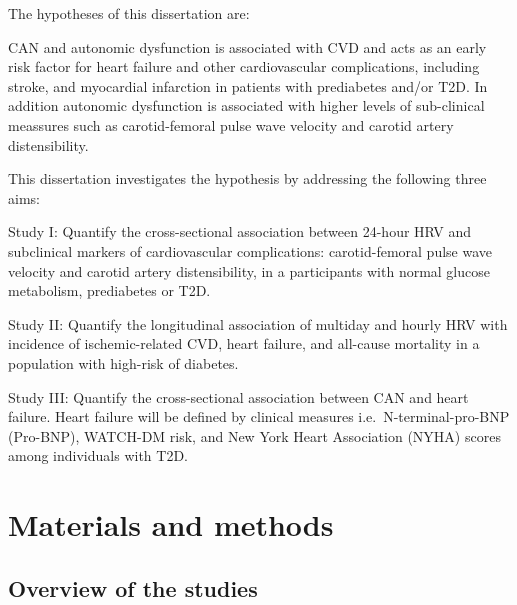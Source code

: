 \documentclass[
  a4paper,
  headsepline=true,
  open=any]{scrbook}
\begin{document}
The hypotheses of this dissertation are:

CAN and autonomic dysfunction is associated with CVD and acts as an
early risk factor for heart failure and other cardiovascular
complications, including stroke, and myocardial infarction in patients
with prediabetes and/or T2D. In addition autonomic dysfunction is
associated with higher levels of sub-clinical meassures such as
carotid-femoral pulse wave velocity and carotid artery distensibility.

This dissertation investigates the hypothesis by addressing the
following three aims:

Study I: Quantify the cross-sectional association between 24-hour HRV
and subclinical markers of cardiovascular complications: carotid-femoral
pulse wave velocity and carotid artery distensibility, in a participants
with normal glucose metabolism, prediabetes or T2D.

Study II: Quantify the longitudinal association of multiday and hourly
HRV with incidence of ischemic-related CVD, heart failure, and all-cause
mortality in a population with high-risk of diabetes.

Study III: Quantify the cross-sectional association between CAN and
heart failure. Heart failure will be defined by clinical measures
i.e.~N-terminal-pro-BNP (Pro-BNP), WATCH-DM risk, and New York Heart
Association (NYHA) scores among individuals with T2D.


\hypertarget{materials-and-methods}{%
\chapter{Materials and methods}\label{materials-and-methods}}

\hypertarget{overview-of-the-studies}{%
\section{Overview of the studies}\label{overview-of-the-studies}}
\end{document}
